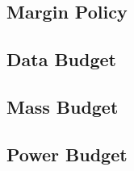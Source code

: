 \subsection{Margin Policy}


\subsection{Data Budget}

\subsection{Mass Budget}

\subsection{Power Budget}
